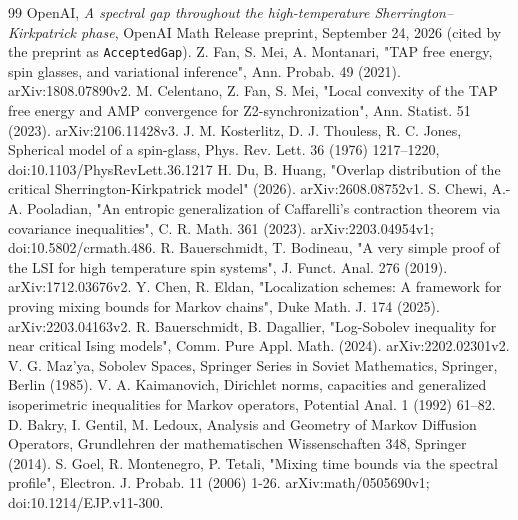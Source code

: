 \documentclass[11pt]{article}
\begin{document}
\begin{thebibliography}{99}
 OpenAI, \emph{A spectral gap throughout the high-temperature Sherrington--Kirkpatrick phase}, OpenAI Math Release preprint, September 24, 2026 (cited by the preprint as \texttt{AcceptedGap}).
 Z. Fan, S. Mei, A. Montanari, "TAP free energy, spin glasses, and variational inference", Ann. Probab. 49 (2021). arXiv:1808.07890v2.
 M. Celentano, Z. Fan, S. Mei, "Local convexity of the TAP free energy and AMP convergence for Z2-synchronization", Ann. Statist. 51 (2023). arXiv:2106.11428v3.
 J. M. Kosterlitz, D. J. Thouless, R. C. Jones, Spherical model of a spin-glass, Phys. Rev. Lett. 36 (1976) 1217--1220, doi:10.1103/PhysRevLett.36.1217
 H. Du, B. Huang, "Overlap distribution of the critical Sherrington-Kirkpatrick model" (2026). arXiv:2608.08752v1.
 S. Chewi, A.-A. Pooladian, "An entropic generalization of Caffarelli's contraction theorem via covariance inequalities", C. R. Math. 361 (2023). arXiv:2203.04954v1; doi:10.5802/crmath.486.
 R. Bauerschmidt, T. Bodineau, "A very simple proof of the LSI for high temperature spin systems", J. Funct. Anal. 276 (2019). arXiv:1712.03676v2.
 Y. Chen, R. Eldan, "Localization schemes: A framework for proving mixing bounds for Markov chains", Duke Math. J. 174 (2025). arXiv:2203.04163v2.
 R. Bauerschmidt, B. Dagallier, "Log-Sobolev inequality for near critical Ising models", Comm. Pure Appl. Math. (2024). arXiv:2202.02301v2.
 V. G. Maz'ya, Sobolev Spaces, Springer Series in Soviet Mathematics, Springer, Berlin (1985).
 V. A. Kaimanovich, Dirichlet norms, capacities and generalized isoperimetric inequalities for Markov operators, Potential Anal. 1 (1992) 61--82.
 D. Bakry, I. Gentil, M. Ledoux, Analysis and Geometry of Markov Diffusion Operators, Grundlehren der mathematischen Wissenschaften 348, Springer (2014).
 S. Goel, R. Montenegro, P. Tetali, "Mixing time bounds via the spectral profile", Electron. J. Probab. 11 (2006) 1-26. arXiv:math/0505690v1; doi:10.1214/EJP.v11-300.
\end{thebibliography}
\end{document}
